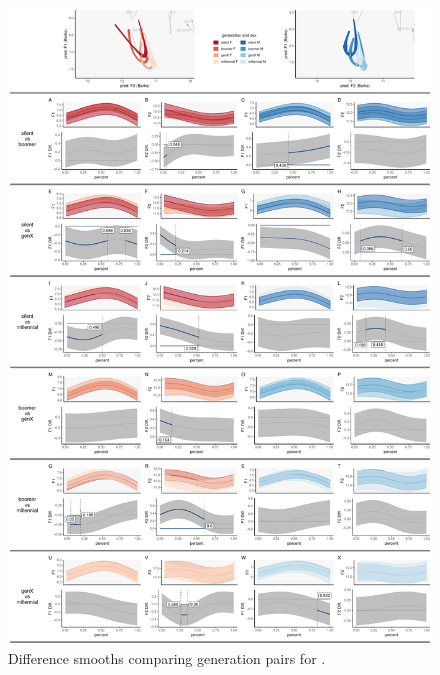 \begin{figure}[p]
    \centering
    \includegraphics[width=\textwidth]{Figures/BAT/BAT_detailed_generation_panel_plot.pdf}
    \caption{Difference smooths comparing generation pairs for \bat.}
    \label{fig:bat_diff_smooths_gen}
\end{figure}

